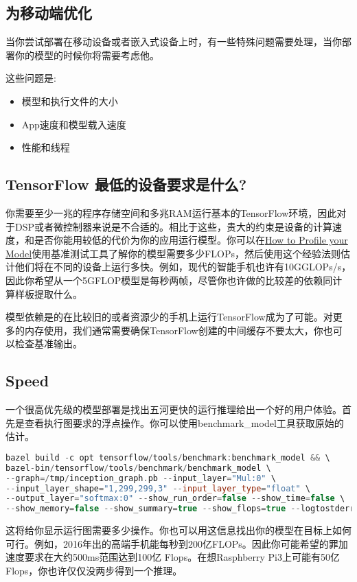 \subsection{为移动端优化}
当你尝试部署在移动设备或者嵌入式设备上时，有一些特殊问题需要处理，当你部署你的模型的时候你将需要考虑他。

这些问题是:
\begin{itemize}
\item 模型和执行文件的大小
\item App速度和模型载入速度
\item 性能和线程
\end{itemize}
\subsection{TensorFlow 最低的设备要求是什么?}
你需要至少一兆的程序存储空间和多兆RAM运行基本的TensorFlow环境，因此对于DSP或者微控制器来说是不合适的。相比于这些，贵大的约束是设备的计算速度，和是否你能用较低的代价为你的应用运行模型。你可以在\href{https://www.tensorflow.org/mobile/optimizing?hl=zh-cn#how_to_profile_your_model}{How to Profile your Model}使用基准测试工具了解你的模型需要多少FLOPs，然后使用这个经验法则估计他们将在不同的设备上运行多快。例如，现代的智能手机也许有10GGLOPs/s，因此你希望从一个5GFLOP模型是每秒两帧，尽管你也许做的比较差的依赖同计算样板提取什么。

模型依赖是的在比较旧的或者资源少的手机上运行TensorFlow成为了可能。对更多的内存使用，我们通常需要确保TensorFlow创建的中间缓存不要太大，你也可以检查基准输出。

\subsection{Speed}
一个很高优先级的模型部署是找出五河更快的运行推理给出一个好的用户体验。首先是查看执行图要求的浮点操作。你可以使用benchmark\_model工具获取原始的估计。
\begin{lstlisting}[language=C++]
bazel build -c opt tensorflow/tools/benchmark:benchmark_model && \
bazel-bin/tensorflow/tools/benchmark/benchmark_model \
--graph=/tmp/inception_graph.pb --input_layer="Mul:0" \
--input_layer_shape="1,299,299,3" --input_layer_type="float" \
--output_layer="softmax:0" --show_run_order=false --show_time=false \
--show_memory=false --show_summary=true --show_flops=true --logtostderr
\end{lstlisting}
这将给你显示运行图需要多少操作。你也可以用这信息找出你的模型在目标上如何可行。例如，2016年出的高端手机能每秒到200亿FLOPs。因此你可能希望的罪加速度要求在大约500ms范围达到100亿 Flops。在想Rasphberry Pi3上可能有50亿Flops，你也许仅仅没两步得到一个推理。

